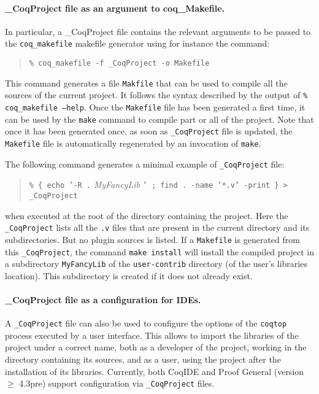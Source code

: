 \paragraph{\_CoqProject file as an argument to  coq\_Makefile.}
In particular, a \_CoqProject file contains the relevant
arguments to be passed to the \texttt{coq\_makefile} makefile
generator using for instance the command:

\begin{quotation}
\texttt{\% coq\_makefile -f \_CoqProject -o Makefile}
\end{quotation}

This command generates a file \texttt{Makfile} that can be used to
compile all the sources of the current project. It follows the
syntax described by the output of \texttt{\% coq\_makefile --help}.
Once the \texttt{Makefile} file has been generated a first time, it
can be used by the \texttt{make} command to compile part or all of
the project. Note that once it has been generated once, as soon as
\texttt{\_CoqProject} file is updated, the \texttt{Makefile} file is
automatically regenerated by an invocation of \texttt{make}.

The following command generates a minimal example of
\texttt{\_CoqProject} file:
\begin{quotation}
\texttt{\% \{ echo '-R .} \textit{MyFancyLib} \texttt{' ; find . -name
  '*.v' -print \} > \_CoqProject}
\end{quotation}
when executed at the root of the directory containing the
project. Here the \texttt{\_CoqProject} lists all the \texttt{.v} files
that are present in the current directory and its subdirectories. But no
plugin sources is listed. If a \texttt{Makefile} is generated from
this \texttt{\_CoqProject}, the command \texttt{make install} will
install the compiled project in a subdirectory \texttt{MyFancyLib} of
the \texttt{user-contrib} directory  (of the user's {\Coq} libraries
location). This subdirectory is created if it does not already exist.

\paragraph{\_CoqProject file as a configuration for IDEs.}

A \texttt{\_CoqProject} file can also be used to configure the options
of the \texttt{coqtop} process executed by a user interface. This
allows to import the libraries of the project under a correct name,
both as a developer of the project, working in the directory
containing its sources, and as a user, using the project after
the installation of its libraries. Currently, both CoqIDE and Proof
General (version $\geq$ 4.3pre) support configuration via
\texttt{\_CoqProject} files.

